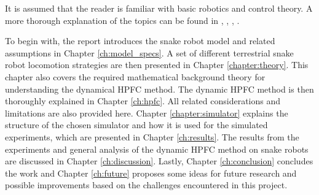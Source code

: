 It is assumed that the reader is familiar with basic robotics and control theory. A more thorough explanation of the topics can be found in \cite{lynch2017modern}, \cite{lynch2017modernCompTorque}, \cite{waldron2016kinematics}, \cite{liljeback2012snake}.

To begin with, the report introduces the snake robot model and related assumptions in Chapter \ref{ch:model_specs}. A set of different terrestrial snake robot locomotion strategies are then presented in Chapter \ref{chapter:theory}. This chapter also covers the required mathematical background theory for understanding the dynamical HPFC method. The dynamic HPFC method is then thoroughly explained in Chapter \ref{ch:hpfc}. All related considerations and limitations are also provided here. Chapter \ref{chapter:simulator} explains the structure of the chosen simulator and how it is used for the simulated experiments, which are presented in Chapter \ref{ch:results}. The results from the experiments and general analysis of the dynamic HPFC method on snake robots are discussed in Chapter \ref{ch:discussion}. Lastly, Chapter \ref{ch:conclusion} concludes the work and Chapter \ref{ch:future} proposes some ideas for future research and possible improvements based on the challenges encountered in this project.